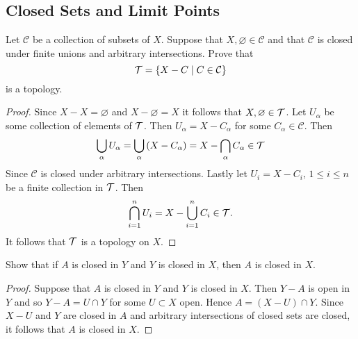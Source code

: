 \subsection{Closed Sets and Limit Points}
\begin{ex}{17.1}
    Let $\mathcal{C}$ be a collection of subsets of $X$. Suppose that $X,\varnothing\in\mathcal{C}$ and that $\mathcal{C}$ is closed under finite unions and arbitrary intersections.
    Prove that
    $$
        \mathcal{T}=\{X-C\mid C\in\mathcal{C}\}
    $$
    is a topology.
\end{ex}
\begin{proof}
    Since $X-X=\varnothing$ and $X-\varnothing=X$ it follows that $X,\varnothing\in\mathcal{T}$. Let $U_\alpha$ be some collection of elements of $\mathcal{T}$.
    Then $U_\alpha = X-C_\alpha$ for some $C_\alpha\in\mathcal{C}$. Then
    $$\bigcup_\alpha U_\alpha = \bigcup_\alpha\left(X-C_\alpha\right)=X-\bigcap_\alpha C_\alpha\in\mathcal{T} $$
    Since $\mathcal{C}$ is closed under arbitrary intersections. Lastly let $U_i=X-C_i$, $1\leq i\leq n$ be a finite collection in $\mathcal{T}$. Then
    $$\bigcap_{i=1}^n U_i=X-\bigcup_{i=1}^n C_i\in\mathcal{T}.$$
    It follows that $\mathcal{T}$ is a topology on $X$.
\end{proof}

\begin{ex}{17.2}
    Show that if $A$ is closed in $Y$ and $Y$ is closed in $X$, then $A$ is closed in $X$.
\end{ex}
\begin{proof}
    Suppose that $A$ is closed in $Y$ and $Y$ is closed in $X$. Then $Y-A$ is open in $Y$ and so $Y-A=U\cap Y$ for some $U\subset X$ open.
    Hence $A = (X-U)\cap Y$. Since $X-U$ and $Y$ are closed in $A$ and arbitrary intersections of closed sets are closed, it follows that $A$ is closed in $X$.
\end{proof}

